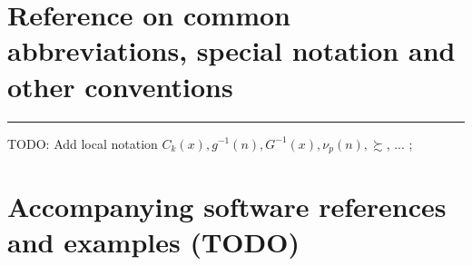 \documentclass[11pt,reqno,a4letter]{article}
\numberwithin{figure}{section}
\numberwithin{table}{section}
\theoremstyle{plain}
\numberwithin{theorem}{section}
\theoremstyle{definition}
\begin{document}
\newpage
\setcounter{section}{0}
\renewcommand{\thesection}{Appendix \Alph{section}}
\renewcommand{\thesubsection}{\Alph{section}.\arabic{subsection}}

\newpage
\section{Reference on common abbreviations, special notation and other conventions} 
\label{Appendix_Glossary_NotationConvs}

     \vskip -0.35in
     \printglossary[type={symbols},title={},style={glossstyleSymbol},nogroupskip=true]

\smallskip\hrule\smallskip 
TODO: Add local notation $C_k(x), g^{-1}(n), G^{-1}(x), \nu_p(n), \succsim$, ... ; 

\newpage
\section{Accompanying software references and examples (TODO)} 
\label{Appendix_SoftwarePackages} 
\end{document}
